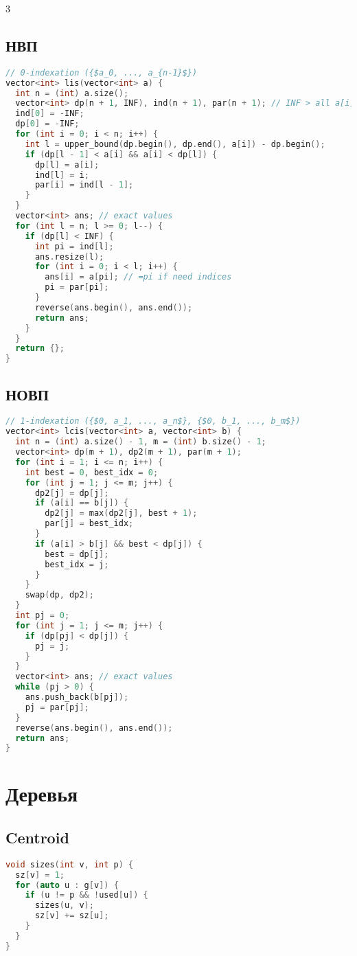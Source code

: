 \documentclass[10pt,a4paper,landscape,twosided]{extarticle}
\begin{document}
\begin{multicols*}{3}
\subsection{НВП}
\begin{lstlisting}[language=C++]
// 0-indexation ({$a_0, ..., a_{n-1}$})
vector<int> lis(vector<int> a) {
  int n = (int) a.size();
  vector<int> dp(n + 1, INF), ind(n + 1), par(n + 1); // INF > all a[i] required
  ind[0] = -INF;
  dp[0] = -INF;
  for (int i = 0; i < n; i++) {
    int l = upper_bound(dp.begin(), dp.end(), a[i]) - dp.begin();
    if (dp[l - 1] < a[i] && a[i] < dp[l]) {
      dp[l] = a[i];
      ind[l] = i;
      par[i] = ind[l - 1];
    }
  }
  vector<int> ans; // exact values
  for (int l = n; l >= 0; l--) {
    if (dp[l] < INF) {
      int pi = ind[l];
      ans.resize(l);
      for (int i = 0; i < l; i++) {
        ans[i] = a[pi]; // =pi if need indices
        pi = par[pi];
      }
      reverse(ans.begin(), ans.end());
      return ans;
    }
  }
  return {};
}
\end{lstlisting}

\subsection{НОВП}
\begin{lstlisting}[language=C++]
// 1-indexation ({$0, a_1, ..., a_n$}, {$0, b_1, ..., b_m$})
vector<int> lcis(vector<int> a, vector<int> b) {
  int n = (int) a.size() - 1, m = (int) b.size() - 1;
  vector<int> dp(m + 1), dp2(m + 1), par(m + 1);
  for (int i = 1; i <= n; i++) {
    int best = 0, best_idx = 0;
    for (int j = 1; j <= m; j++) {
      dp2[j] = dp[j];
      if (a[i] == b[j]) {
        dp2[j] = max(dp2[j], best + 1);
        par[j] = best_idx;
      }
      if (a[i] > b[j] && best < dp[j]) {
        best = dp[j];
        best_idx = j;
      }
    }
    swap(dp, dp2);
  }
  int pj = 0;
  for (int j = 1; j <= m; j++) {
    if (dp[pj] < dp[j]) {
      pj = j;
    }
  }
  vector<int> ans; // exact values
  while (pj > 0) {
    ans.push_back(b[pj]);
    pj = par[pj];
  }
  reverse(ans.begin(), ans.end());
  return ans;
}
\end{lstlisting}

\section{Деревья}

\subsection{Centroid}
\begin{lstlisting}[language=C++]
void sizes(int v, int p) {
  sz[v] = 1;
  for (auto u : g[v]) {
    if (u != p && !used[u]) {
      sizes(u, v);
      sz[v] += sz[u];
    }
  }
}


\end{lstlisting}
\end{multicols*}
\end{document}
